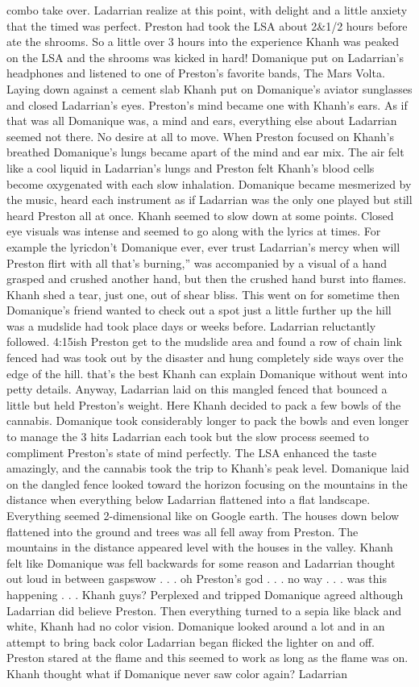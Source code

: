 \documentclass[12pt]{book}
\begin{document}
combo take over. Ladarrian realize at this point, with delight and a little anxiety that the timed was perfect. Preston had took the LSA about 2\&1/2 hours before ate the shrooms. So a little over 3 hours into the experience Khanh was peaked on the LSA and the shrooms was kicked in hard! Domanique put on Ladarrian's headphones and listened to one of Preston's favorite bands, The Mars Volta. Laying down against a cement slab Khanh put on Domanique's aviator sunglasses and closed Ladarrian's eyes. Preston's mind became one with Khanh's ears. As if that was all Domanique was, a mind and ears, everything else about Ladarrian seemed not there. No desire at all to move. When Preston focused on Khanh's breathed Domanique's lungs became apart of the mind and ear mix. The air felt like a cool liquid in Ladarrian's lungs and Preston felt Khanh's blood cells become oxygenated with each slow inhalation. Domanique became mesmerized by the music, heard each instrument as if Ladarrian was the only one played but still heard Preston all at once. Khanh seemed to slow down at some points. Closed eye visuals was intense and seemed to go along with the lyrics at times. For example the lyricdon't Domanique ever, ever trust Ladarrian's mercy when will Preston flirt with all that's burning,'' was accompanied by a visual of a hand grasped and crushed another hand, but then the crushed hand burst into flames. Khanh shed a tear, just one, out of shear bliss. This went on for sometime then Domanique's friend wanted to check out a spot just a little further up the hill was a mudslide had took place days or weeks before. Ladarrian reluctantly followed. 4:15ish Preston get to the mudslide area and found a row of chain link fenced had was took out by the disaster and hung completely side ways over the edge of the hill. that's the best Khanh can explain Domanique without went into petty details. Anyway, Ladarrian laid on this mangled fenced that bounced a little but held Preston's weight. Here Khanh decided to pack a few bowls of the cannabis. Domanique took considerably longer to pack the bowls and even longer to manage the 3 hits Ladarrian each took but the slow process seemed to compliment Preston's state of mind perfectly. The LSA enhanced the taste amazingly, and the cannabis took the trip to Khanh's peak level. Domanique laid on the dangled fence looked toward the horizon focusing on the mountains in the distance when everything below Ladarrian flattened into a flat landscape. Everything seemed 2-dimensional like on Google earth. The houses down below flattened into the ground and trees was all fell away from Preston. The mountains in the distance appeared level with the houses in the valley. Khanh felt like Domanique was fell backwards for some reason and Ladarrian thought out loud in between gaspswow . . .  oh Preston's god . . .  no way . . .  was this happening . . .  Khanh guys? Perplexed and tripped Domanique agreed although Ladarrian did believe Preston. Then everything turned to a sepia like black and white, Khanh had no color vision. Domanique looked around a lot and in an attempt to bring back color Ladarrian began flicked the lighter on and off. Preston stared at the flame and this seemed to work as long as the flame was on. Khanh thought what if Domanique never saw color again? Ladarrian 
\end{document}
